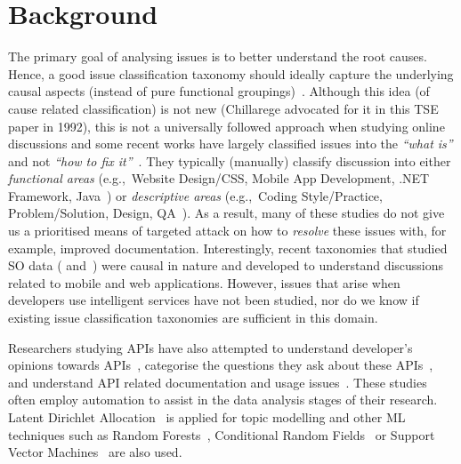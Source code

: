 \section{Background}
\label{icse2020:sec:related-work}

The primary goal of analysing issues is to better understand the root causes. Hence, a good issue classification taxonomy should ideally capture the underlying causal aspects (instead of pure functional groupings)~\citep{Chillarege:1992tm}. Although this idea (of cause related classification) is not new (Chillarege advocated for it in this TSE paper in 1992), this is not a universally followed approach when studying online discussions and some recent works have largely classified issues into the \textit{``what is''} and not \textit{``how to fix it''}~\citep{Barua:2012gz,Beyer:2014ec,Uddin:2019cz}. They typically (manually) classify discussion into either \textit{functional areas} (e.g.,~Website Design/CSS, Mobile App Development, .NET Framework, Java~\citep{Barua:2012gz}) or \textit{descriptive areas} (e.g.,~Coding Style/Practice, Problem/Solution, Design, QA~\citep{Barua:2012gz,Uddin:2019cz}). As a result, many of these studies do not give us a prioritised means of targeted attack on how to \textit{resolve} these issues with, for example, improved documentation. Interestingly, recent taxonomies that studied SO data (\citet{Aghajani:2019bo} and~\citet{Beyer:2018fm}) were causal in nature and developed to understand discussions related to mobile and web applications.  However, issues that arise when developers use intelligent services have not been studied, nor do we know if existing issue classification taxonomies are sufficient in this domain. 

Researchers studying APIs have also attempted to understand developer's opinions towards APIs~\citep{Uddin:2019cz}, categorise the questions they ask about these APIs~\citep{Rosen:2016uk,Barzilay:2013cn,Barua:2012gz,Beyer:2018fm}, and understand API related documentation and usage issues~\citep{Tahir:2018ks,Ahasanuzzaman:2018kv,Hou:2013jf,Aghajani:2019bo,Barua:2012gz,Allamanis:2013is}. These studies often employ automation to assist in the data analysis stages of their research. Latent Dirichlet Allocation~\citep{Uddin:2019cz,Barua:2012gz,Rosen:2016uk,Allamanis:2013is} is applied for topic modelling and other ML techniques such as Random Forests~\citep{Beyer:2018fm}, Conditional Random Fields~\citep{Ahasanuzzaman:2018kv} or Support Vector Machines~\citep{Hou:2013jf,Beyer:2018fm} are also used. 

